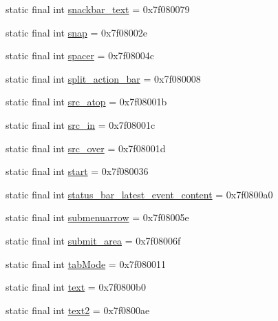 \begin{CompactItemize}
\item 
static final int \hyperlink{classandroid_1_1support_1_1v7_1_1cardview_1_1_r_1_1id_8dbbf02749754351ae3da5c5dfca9dde}{snackbar\_\-text} = 0x7f080079
\item 
static final int \hyperlink{classandroid_1_1support_1_1v7_1_1cardview_1_1_r_1_1id_9c56e76a573c7a7fd3d8618eecb17983}{snap} = 0x7f08002e
\item 
static final int \hyperlink{classandroid_1_1support_1_1v7_1_1cardview_1_1_r_1_1id_67532e9803a10f8cd46fad6b434d510c}{spacer} = 0x7f08004c
\item 
static final int \hyperlink{classandroid_1_1support_1_1v7_1_1cardview_1_1_r_1_1id_88cf906d6fc1396061dcd74bd9adad6d}{split\_\-action\_\-bar} = 0x7f080008
\item 
static final int \hyperlink{classandroid_1_1support_1_1v7_1_1cardview_1_1_r_1_1id_91896965038fa2d0f08b0cd0699abfb6}{src\_\-atop} = 0x7f08001b
\item 
static final int \hyperlink{classandroid_1_1support_1_1v7_1_1cardview_1_1_r_1_1id_207f064db0cfea500464aa5960581efc}{src\_\-in} = 0x7f08001c
\item 
static final int \hyperlink{classandroid_1_1support_1_1v7_1_1cardview_1_1_r_1_1id_417b9cf6ccd42d9c2d5bd682a8bc42b0}{src\_\-over} = 0x7f08001d
\item 
static final int \hyperlink{classandroid_1_1support_1_1v7_1_1cardview_1_1_r_1_1id_52f43d1506c3fafcf0204817c89baad3}{start} = 0x7f080036
\item 
static final int \hyperlink{classandroid_1_1support_1_1v7_1_1cardview_1_1_r_1_1id_a7ada7ed28555edff11799b4ae308153}{status\_\-bar\_\-latest\_\-event\_\-content} = 0x7f0800a0
\item 
static final int \hyperlink{classandroid_1_1support_1_1v7_1_1cardview_1_1_r_1_1id_ccc5a31cc2f90fd2d87ff8ad31199d7e}{submenuarrow} = 0x7f08005e
\item 
static final int \hyperlink{classandroid_1_1support_1_1v7_1_1cardview_1_1_r_1_1id_b350d6768583d9fadad3d36101bb7d81}{submit\_\-area} = 0x7f08006f
\item 
static final int \hyperlink{classandroid_1_1support_1_1v7_1_1cardview_1_1_r_1_1id_edd6beaad18d25e2c4eabae53021599f}{tabMode} = 0x7f080011
\item 
static final int \hyperlink{classandroid_1_1support_1_1v7_1_1cardview_1_1_r_1_1id_24f87e4f1885c871174ab25c2edac96f}{text} = 0x7f0800b0
\item 
static final int \hyperlink{classandroid_1_1support_1_1v7_1_1cardview_1_1_r_1_1id_9abe9347e3d459af9faa42a6f28a59c3}{text2} = 0x7f0800ae

\end{CompactItemize}

